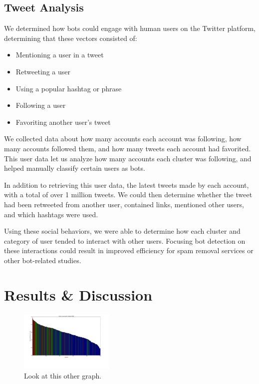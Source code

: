\documentclass{sig-alternate-05-2015}
\begin{document}
\subsection{Tweet Analysis}

We determined how bots could engage with human users on the Twitter platform, determining that these vectors consisted of:
\begin{itemize}
	\item Mentioning a user in a tweet
	\item Retweeting a user
	\item Using a popular hashtag or phrase
	\item Following a user
	\item Favoriting another user's tweet
\end{itemize}
We collected data about how many accounts each account was following, how many accounts followed them, and how many tweets each account had favorited. This user data let us analyze how many accounts each cluster was following, and helped manually classify certain users as bots.

In addition to retrieving this user data, the latest tweets made by each account, with a total of over 1 million tweets. We could then determine whether the tweet had been retweeted from another user, contained links, mentioned other users, and which hashtags were used.

Using these social behaviors, we were able to determine how each cluster and category of user tended to interact with other users. Focusing bot detection on these interactions could result in improved efficiency for spam removal services or other bot-related studies.

\section{Results \& Discussion}

\begin{figure}
	\caption{Look at this other graph.}
	\centering
		\includegraphics[width=0.4\textwidth]{imgs/bsvaclr}
\end{figure}
\end{document}
